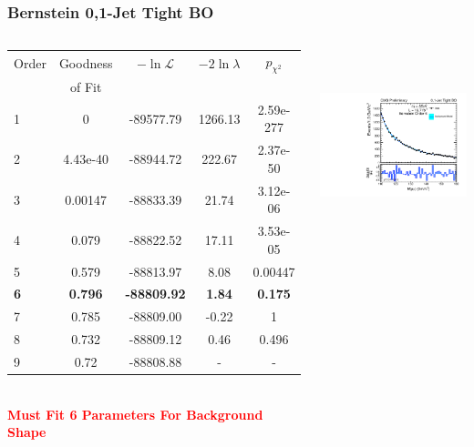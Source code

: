 \documentclass{beamer}
\newcommand{\tredbf}[1]{\textcolor{red}{\bf #1}}
\begin{document}
\begin{frame}
\frametitle{Bernstein 0,1-Jet Tight BO}
  \begin{columns}[c]
   \column{60mm}
      \begin{center}
      \tiny
\begin{tabular}{|l|c|c|c|c|} \hline
Order & Goodness & $-\ln\mathcal{L}$ & $-2\ln\lambda$ & $p_{\chi^2}$ \\ 
 & of Fit  &  & &  \\ \hline \hline
1 & 0 & -89577.79 & 1266.13 & 2.59e-277  \\ \hline
2 & 4.43e-40 & -88944.72 & 222.67 & 2.37e-50  \\ \hline
3 & 0.00147 & -88833.39 & 21.74 & 3.12e-06  \\ \hline
4 & 0.079 & -88822.52 & 17.11 & 3.53e-05  \\ \hline
5 & 0.579 & -88813.97 & 8.08 & 0.00447  \\ \hline
\bf 6 & \bf 0.796 & \bf -88809.92 & \bf 1.84 & \bf 0.175  \\ \hline
7 & 0.785 & -88809.00 & -0.22 & 1  \\ \hline
8 & 0.732 & -88809.12 & 0.46 & 0.496  \\ \hline
9 & 0.72 & -88808.88 & - & -  \\ \hline
\end{tabular}
\\
\normalsize
\vspace{2em}
\tredbf{Must Fit 6 Parameters For Background Shape}
      \end{center}
   \column{60mm}
      \begin{center}
        \includegraphics[height=55mm]{wholeRangeHggStudy1/plotsOrderStudyPolysHighOrders/order_Shape_Jets01PassPtG10BO_Bernstein6}
      \end{center}
  \end{columns}
  \begin{center}
  \end{center}
\end{frame}
\end{document}
